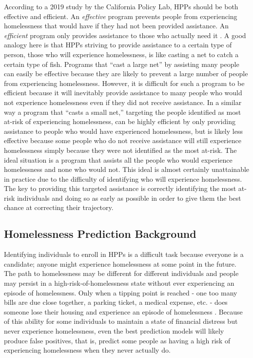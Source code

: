 \documentclass[utf8]{frontiersFPHY} %
\begin{document}
According to a 2019 study by the California Policy Lab, HPPs should be both effective and efficient. An \textit{effective} program prevents people from experiencing homelessness that would have if they had not been provided assistance. An \textit{efficient} program only provides assistance to those who actually need it \cite{PredictPreventHmlsnsLA}. A good analogy here is that HPPs striving to provide assistance to a certain type of person, those who will experience homelessness, is like casting a net to catch a certain type of fish. Programs that ``cast a large net'' by assisting many people can easily be effective because they are likely to prevent a large number of people from experiencing homelessness. However, it is difficult for such a program to be efficient because it will inevitably provide assistance to many people who would not experience homelessness even if they did not receive assistance. In a similar way a program that ``casts a small net,'' targeting the people identified as most at-risk of experiencing homelessness, can be highly efficient by only providing assistance to people who would have experienced homelessness, but is likely less effective because some people who do not receive assistance will still experience homelessness simply because they were not identified as the most at-risk. The ideal situation is a program that assists all the people who would experience homelessness and none who would not. This ideal is almost certainly unattainable in practice due to the difficulty of identifying who will experience homelessness. The key to providing this targeted assistance is correctly identifying the most at-risk individuals and doing so as early as possible in order to give them the best chance at correcting their trajectory.

\subsection*{Homelessness Prediction Background}
Identifying individuals to enroll in HPPs is a difficult task because everyone is a candidate; anyone might experience homelessness at some point in the future. The path to homelessness may be different for different individuals and people may persist in a high-risk-of-homelessness state without ever experiencing an episode of homelessness. Only when a tipping point is reached - one too many bills are due close together, a parking ticket, a medical expense, etc. - does someone lose their housing and experience an episode of homelessness \cite{o2004wrong}. Because of this ability for some individuals to maintain a state of financial distress but never experience homelessness, even the best prediction models will likely produce false positives, that is, predict some people as having a high risk of experiencing homelessness when they never actually do.
\end{document}
